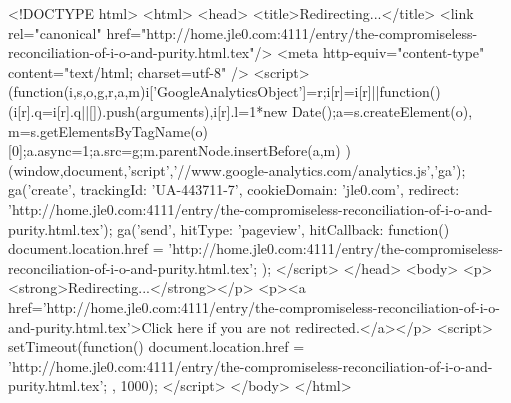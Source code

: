<!DOCTYPE html>
<html>
<head>
<title>Redirecting...</title>
<link rel="canonical" href="http://home.jle0.com:4111/entry/the-compromiseless-reconciliation-of-i-o-and-purity.html.tex"/>
<meta http-equiv="content-type" content="text/html; charset=utf-8" />
<script>
(function(i,s,o,g,r,a,m){i['GoogleAnalyticsObject']=r;i[r]=i[r]||function(){
(i[r].q=i[r].q||[]).push(arguments)},i[r].l=1*new Date();a=s.createElement(o),
m=s.getElementsByTagName(o)[0];a.async=1;a.src=g;m.parentNode.insertBefore(a,m)
})(window,document,'script','//www.google-analytics.com/analytics.js','ga');
ga('create', { trackingId: 'UA-443711-7', cookieDomain: 'jle0.com', redirect: 'http://home.jle0.com:4111/entry/the-compromiseless-reconciliation-of-i-o-and-purity.html.tex'});
ga('send', { hitType: 'pageview', hitCallback: function() { document.location.href = 'http://home.jle0.com:4111/entry/the-compromiseless-reconciliation-of-i-o-and-purity.html.tex'; } });
</script>
</head>
<body>
  <p><strong>Redirecting...</strong></p>
  <p><a href='http://home.jle0.com:4111/entry/the-compromiseless-reconciliation-of-i-o-and-purity.html.tex'>Click here if you are not redirected.</a></p>
  <script>
    setTimeout(function() { document.location.href = 'http://home.jle0.com:4111/entry/the-compromiseless-reconciliation-of-i-o-and-purity.html.tex'; }, 1000);
  </script>
</body>
</html>
